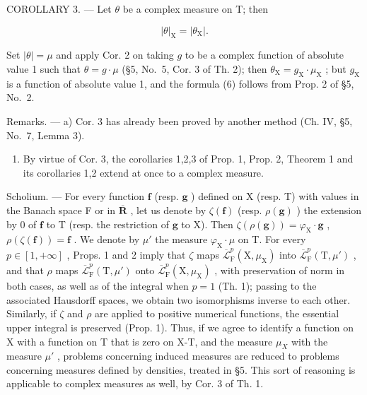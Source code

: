 COROLLARY 3. --- Let \(\theta\) be a complex measure on T; then

\[
| \theta | _ {\mathrm{X}} = | \theta_ {\mathrm{X}} |.\tag{6}
\]

Set \(|\theta| = \mu\) and apply Cor. 2 on taking \(g\) to be a complex function of absolute value 1 such that \(\theta = g \cdot \mu\) (§5, No.~5, Cor. 3 of Th. 2); then \(\theta_{\mathrm{X}} = g_{\mathrm{X}} \cdot \mu_{\mathrm{X}}\) ; but \(g_{\mathrm{X}}\) is a function of absolute value 1, and the formula (6) follows from Prop. 2 of §5, No.~2.

Remarks. --- a) Cor. 3 has already been proved by another method (Ch. IV, §5, No.~7, Lemma 3).

\begin{enumerate}
\def\labelenumi{\alph{enumi})}
\setcounter{enumi}{1}
\tightlist
\item
  By virtue of Cor. 3, the corollaries 1,2,3 of Prop. 1, Prop. 2, Theorem 1 and its corollaries 1,2 extend at once to a complex measure.
\end{enumerate}

Scholium. --- For every function \(\mathbf{f}\) (resp. \(\mathbf{g}\) ) defined on X (resp. T) with values in the Banach space F or in \(\overline{\mathbf{R}}\) , let us denote by \(\zeta(\mathbf{f})\) (resp. \(\rho(\mathbf{g})\) ) the extension by 0 of \(\mathbf{f}\) to T (resp. the restriction of \(\mathbf{g}\) to X). Then \(\zeta(\rho(\mathbf{g})) = \varphi_{\mathrm{X}} \cdot \mathbf{g}\) , \(\rho(\zeta(\mathbf{f})) = \mathbf{f}\) . We denote by \(\mu'\) the measure \(\varphi_{\mathrm{X}} \cdot \mu\) on T. For every \(p \in [1, +\infty]\) , Props. 1 and 2 imply that \(\zeta\) maps \(\overline{\mathcal{L}}_{\mathrm{F}}^{p}(\mathrm{X}, \mu_{\mathrm{X}})\) into \(\overline{\mathcal{L}}_{\mathrm{F}}^{p}(\mathrm{T}, \mu')\) , and that \(\rho\) maps \(\overline{\mathcal{L}}_{\mathrm{F}}^{p}(\mathrm{T}, \mu')\) onto \(\overline{\mathcal{L}}_{\mathrm{F}}^{p}(\mathrm{X}, \mu_{\mathrm{X}})\) , with preservation of norm in both cases, as well as of the integral when \(p = 1\) (Th. 1); passing to the associated Hausdorff spaces, we obtain two isomorphisms inverse to each other. Similarly, if \(\zeta\) and \(\rho\) are applied to positive numerical functions, the essential upper integral is preserved (Prop. 1). Thus, if we agree to identify a function on X with a function on T that is zero on X-T, and the measure \(\mu_{X}\) with the measure \(\mu'\) , problems concerning induced measures are reduced to problems concerning measures defined by densities, treated in §5. This sort of reasoning is applicable to complex measures as well, by Cor. 3 of Th. 1.
\relax{}
